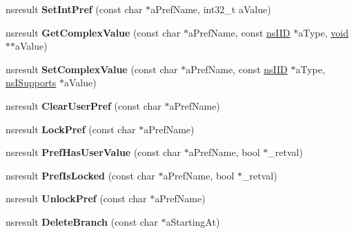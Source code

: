 \begin{DoxyCompactItemize}
\mbox{\label{interfacens_i_pref_branch_a768ef0c837fa74d7324bcc1cf269e7bd}} 
nsresult {\bfseries Set\+Int\+Pref} (const char $\ast$a\+Pref\+Name, int32\+\_\+t a\+Value)
\item 
\mbox{\label{interfacens_i_pref_branch_ab88ef7eed72ed54b8339491a6f45066b}} 
nsresult {\bfseries Get\+Complex\+Value} (const char $\ast$a\+Pref\+Name, const \hyperlink{struct___i_i_d}{ns\+I\+ID} $\ast$a\+Type, \hyperlink{interfacevoid}{void} $\ast$$\ast$a\+Value)
\item 
\mbox{\label{interfacens_i_pref_branch_a222bb2b4876be441aa13546603702c35}} 
nsresult {\bfseries Set\+Complex\+Value} (const char $\ast$a\+Pref\+Name, const \hyperlink{struct___i_i_d}{ns\+I\+ID} $\ast$a\+Type, \hyperlink{interfacens_i_supports}{ns\+I\+Supports} $\ast$a\+Value)
\item 
\mbox{\label{interfacens_i_pref_branch_a837124ce8a4ba03de57e603ea50436b9}} 
nsresult {\bfseries Clear\+User\+Pref} (const char $\ast$a\+Pref\+Name)
\item 
\mbox{\label{interfacens_i_pref_branch_a89a13cee022a733f97a6e1c9c2c76c60}} 
nsresult {\bfseries Lock\+Pref} (const char $\ast$a\+Pref\+Name)
\item 
\mbox{\label{interfacens_i_pref_branch_a52e3c3ed1fec0850f0b4e54bd69deddf}} 
nsresult {\bfseries Pref\+Has\+User\+Value} (const char $\ast$a\+Pref\+Name, bool $\ast$\+\_\+retval)
\item 
\mbox{\label{interfacens_i_pref_branch_a601bacd25a1840d7ffca21413c5ad0c7}} 
nsresult {\bfseries Pref\+Is\+Locked} (const char $\ast$a\+Pref\+Name, bool $\ast$\+\_\+retval)
\item 
\mbox{\label{interfacens_i_pref_branch_acc7aa8a0483be6b7852a4ade083783f7}} 
nsresult {\bfseries Unlock\+Pref} (const char $\ast$a\+Pref\+Name)
\item 
\mbox{\label{interfacens_i_pref_branch_a3e62cb6a8e6eeccd9ce4215b72772aa8}} 
nsresult {\bfseries Delete\+Branch} (const char $\ast$a\+Starting\+At)
$$
\end{DoxyCompactItemize}
